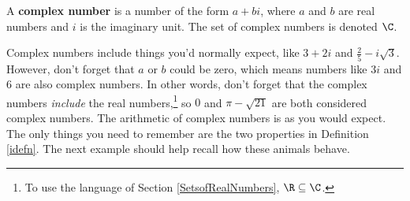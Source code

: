\documentclass[10pt]{article}
\begin{document}
\medskip

\colorbox{ResultColor}{\bbm
\begin{defn} \label{complexdefn} A \textbf{complex number} is a number of the form $a+bi$, where $a$ and $b$ are real numbers and $i$ is the imaginary unit.  The set of complex numbers is denoted $\C$.
\end{defn}
\ebm}

\medskip

Complex numbers include things you'd normally expect, like $3+2i$ and $\frac{2}{5} - i\sqrt{3}$.  However, don't forget that $a$ or $b$ could be zero, which means numbers like $3i$ and $6$ are also complex numbers.  In other words, don't forget that the complex numbers \textit{include} the real numbers,\footnote{To use the language  of Section \ref{SetsofRealNumbers}, $\R \subseteq \C$.} so $0$ and $\pi - \sqrt{21}$ are both considered complex numbers.   The arithmetic of complex numbers is as you would expect.  The only things you need to remember are the two properties in Definition \ref{idefn}.  The next example should help recall how these animals behave.

\pagebreak
\end{document}
